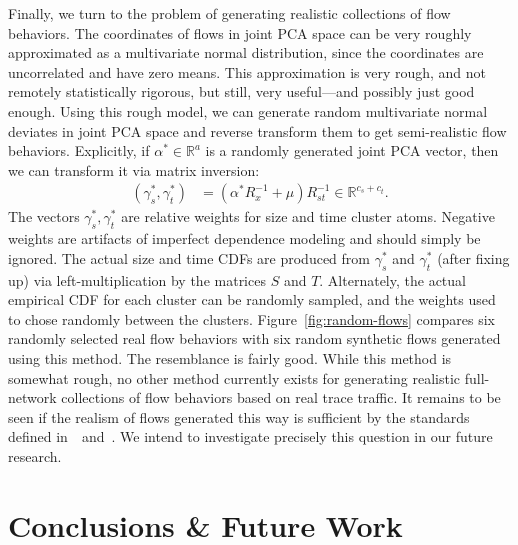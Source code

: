 \documentclass[conference]{IEEEtran}
\newcommand{\caps}[1]{{\small{#1}}}
\newcommand{\R}{\mathbb{R}}
\begin{document}
Finally, we turn to the problem of generating realistic collections of flow behaviors. The coordinates of flows in joint \caps{PCA} space can be very roughly approximated as a multivariate normal distribution, since the coordinates are uncorrelated and have zero means. This approximation is very rough, and not remotely statistically rigorous, but still, very useful---and possibly just good enough. Using this rough model, we can generate random multivariate normal deviates in joint \caps{PCA} space and reverse transform them to get semi-realistic flow behaviors. Explicitly, if $\alpha^* \in \R^a$ is a randomly generated joint \caps{PCA} vector, then we can transform it via matrix inversion:
\begin{align}
(\gamma^*_s,\gamma^*_t) &= \left(\alpha^* R_{x}^{-1}+\mu\right) R_{st}^{-1} \in \R^{c_s+c_t}.
\end{align}
The vectors $\gamma^*_s,\gamma^*_t$ are relative weights for size and time cluster atoms. Negative weights are artifacts of imperfect dependence modeling and should simply be ignored. The actual size and time \caps{CDF}s are produced from $\gamma^*_s$ and $\gamma^*_t$ (after fixing up) via left-multiplication by the matrices $S$ and $T$. Alternately, the actual empirical \caps{CDF} for each cluster can be randomly sampled, and the weights used to chose randomly between the clusters. Figure~\ref{fig:random-flows} compares six randomly selected real flow behaviors with six random synthetic flows generated using this method. The resemblance is fairly good. While this method is somewhat rough, no other method currently exists for generating realistic full-network collections of flow behaviors based on real trace traffic. %
It remains to be seen if the realism of flows generated this way is sufficient by the standards defined in~\cite{Karpinski07:realism}~and~\cite{Karpinski07:cbr-failure}. We intend to investigate precisely this question in our future research.

\section{Conclusions \& Future Work}
\label{sec:conclusions}
\end{document}
